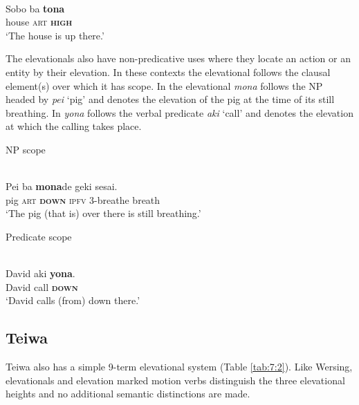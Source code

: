 \ea%
\label{ex:7:3}
 \\
\gll Sobo  ba  \textbf{{tona}}\\
        house  \textsc{art} \textbf{\textsc{high}} \\
\glt`The house is up there.' 
\z

  



   

The elevationals also have non-predicative uses where they locate an action or an entity by their elevation. In these contexts the elevational follows the clausal element(s) over which it has scope. In  the elevational \textit{mona} follows the NP headed by \textit{pei} `pig' and denotes the elevation of the pig at the time of its still breathing. In  \textit{yona} follows the verbal predicate \textit{aki} `call' and denotes the elevation at which the calling takes place.

 NP scope



\ea%
\label{ex:7:4}
 \\
\gll Pei   ba  \textbf{{mona}}{de}  geki{\ng}  sesai.\\
       pig  \textsc{art} \textbf{\textsc{down}} \textsc{ipfv} \textsc{3-}breathe  breath \\
\glt  `The pig (that is) over there is still breathing.'
\z

 

 



Predicate scope    



\ea%
\label{ex:7:5}
 \\
\gll David   aki  \textbf{{yona}}{.} \\
       David  call  \textbf{\textsc{down}} \\
\glt `David calls (from) down there.'
\z

  

 

 

\subsection{Teiwa}
Teiwa also has a simple 9-term elevational system (Table \ref{tab:7:2}). Like Wersing, elevationals and elevation marked motion verbs distinguish the three elevational heights and no additional semantic distinctions are made.

